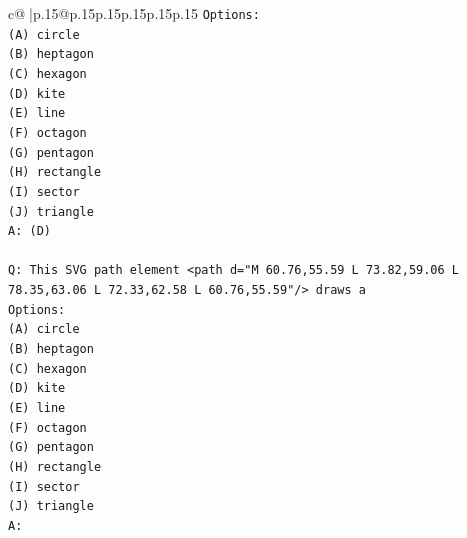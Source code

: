 \documentclass{article}
\begin{document}
{\begin{supertabular}{c@{$\;$}|p{.15\linewidth}@{}p{.15\linewidth}p{.15\linewidth}p{.15\linewidth}p{.15\linewidth}p{.15\linewidth}}
{{{\texttt{Options:} \\
\texttt{(A) circle} \\
\texttt{(B) heptagon} \\
\texttt{(C) hexagon} \\
\texttt{(D) kite} \\
\texttt{(E) line} \\
\texttt{(F) octagon} \\
\texttt{(G) pentagon} \\
\texttt{(H) rectangle} \\
\texttt{(I) sector} \\
\texttt{(J) triangle} \\
\texttt{A: (D)} \\
\\ 
\texttt{Q: This SVG path element <path d="M 60.76,55.59 L 73.82,59.06 L 78.35,63.06 L 72.33,62.58 L 60.76,55.59"/> draws a} \\
\texttt{Options:} \\
\texttt{(A) circle} \\
\texttt{(B) heptagon} \\
\texttt{(C) hexagon} \\
\texttt{(D) kite} \\
\texttt{(E) line} \\
\texttt{(F) octagon} \\
\texttt{(G) pentagon} \\
\texttt{(H) rectangle} \\
\texttt{(I) sector} \\
\texttt{(J) triangle} \\
\texttt{A:} \\
            }
        }
    }
     \\ \\


\end{supertabular}}
\end{document}
